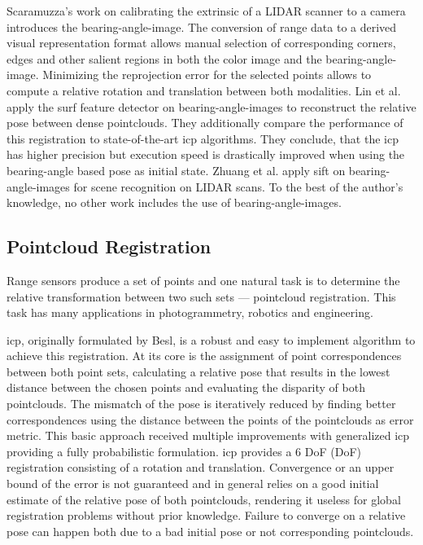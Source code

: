 Scaramuzza's work on calibrating the extrinsic of a \acrshort{LIDAR} scanner to a camera\cite{scaramuzza_iros2007} introduces the \gls{bearing-angle-image}.
The conversion of range data to a derived visual representation format allows manual selection of corresponding corners, edges and other salient regions in both the color image and the \gls{bearing-angle-image}\cite{scaramuzza_iros2007}.
Minimizing the reprojection error for the selected points allows to compute a relative rotation and translation between both modalities.
Lin et al.\cite{lin_easp2017} apply the \acrshort{surf}\cite{bay_eccv06} \gls{feature} detector on \glspl{bearing-angle-image} to reconstruct the relative pose between dense pointclouds.
They additionally compare the performance of this registration to state-of-the-art \acrshort{icp} algorithms.
They conclude, that the \acrshort{icp} has higher precision but execution speed is drastically improved when using the \gls{bearing-angle} based pose as initial state.
Zhuang et al.\cite{zhuang_iam2013} apply \acrshort{sift}\cite{lowe_ijcv04} on \glspl{bearing-angle-image} for scene recognition on \acrshort{LIDAR} scans.
To the best of the author's knowledge, no other work includes the use of \glspl{bearing-angle-image}.

\subsection{Pointcloud Registration}

Range sensors produce a set of points and one natural task is to determine the relative transformation between two such sets --- pointcloud registration.
This task has many applications in photogrammetry, robotics and engineering.

\acrshort{icp}, originally formulated by Besl\cite{besl_pami1992}, is a robust and easy to implement algorithm to achieve this registration.
At its core is the assignment of point correspondences between both point sets, calculating a relative pose that results in the lowest distance between the chosen points and evaluating the disparity of both pointclouds.
The mismatch of the pose is iteratively reduced by finding better correspondences using the distance between the points of the pointclouds as error metric.
This basic approach received multiple improvements with generalized \acrshort{icp}\cite{segal_2009,korn_2014} providing a fully probabilistic formulation.
\acrshort{icp} provides a 6 \acrlong{DoF} (\acrshort{DoF}) registration consisting of a rotation and translation.
Convergence or an upper bound of the error is not guaranteed and in general relies on a good initial estimate of the relative pose of both pointclouds, rendering it useless for global registration problems without prior knowledge.
Failure to converge on a relative pose can happen both due to a bad initial pose or not corresponding pointclouds.


